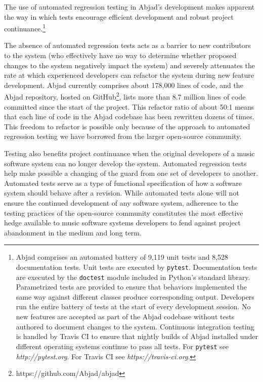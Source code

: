 \documentclass{article}
\begin{document}
The use of automated regression testing in Abjad's development makes apparent
the way in which tests encourage efficient development and robust project
continuance.\footnote{Abjad comprises an automated battery of 9,119 unit tests
and 8,528 documentation tests. Unit tests are executed by \texttt{pytest}.
Documentation tests are executed by the \texttt{doctest} module included in
Python's standard library. Parametrized tests are provided to ensure that
behaviors implemented the same way against different classes produce
corresponding output. Developers run the entire battery of tests at the start
of every development session. No new features are accepted as part of the Abjad
codebase without tests authored to document changes to the system. Continuous
integration testing is handled by Travis CI to ensure that nightly builds of
Abjad installed under different operating systems continue to pass all tests.
For \texttt{pytest} see \textit{http://pytest.org}. For Travis CI see
\textit{https://travis-ci.org}.}

The absence of automated regression tests acts as a barrier to new contributors
to the system (who effectively have no way to determine whether proposed
changes to the system negatively impact the system) and severely attenuates the
rate at which experienced developers can refactor the system during new feature
development. Abjad currently comprises about 178,000 lines of code, and the
Abjad repository, hosted on GitHub\footnote{https://github.com/Abjad/abjad},
lists more than 8.7 million lines of code committed since the start of the
project. This refactor ratio of about 50:1 means that each line of code in the
Abjad codebase has been rewritten dozens of times. This freedom to refactor is
possible only because of the approach to automated regression testing we have
borrowed from the larger open-source community.

Testing also benefits project continuance when the original developers of a
music software system can no longer develop the system. Automated regression
tests help make possible a changing of the guard from one set of developers to
another. Automated tests serve as a type of functional specification of how a
software system should behave after a revision. While
automated tests alone will not ensure the continued development of any software
system, adherence to the testing practices of the open-source community
constitutes the most effective hedge available to music software systems
developers to fend against project abandonment in the medium and long term.
\end{document}
